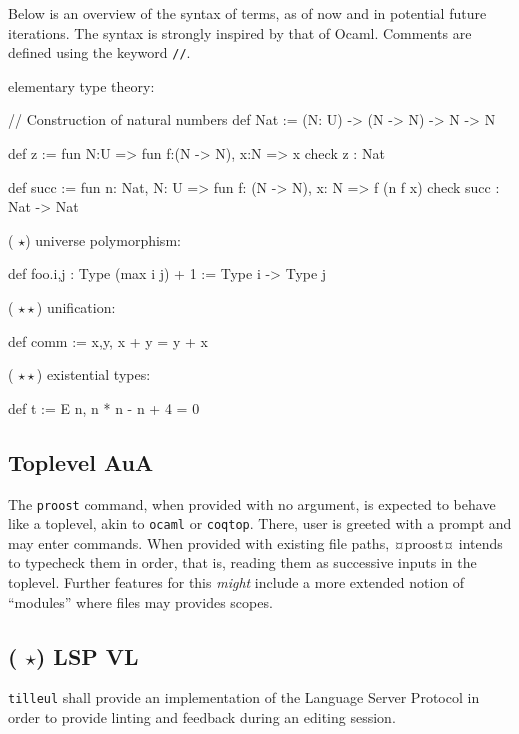\documentclass[twocolumn]{article}
\newcommand{\members}[1]{\texorpdfstring{\hfill\scriptsize #1}{}}
\newcommand{\etun}{({\color{Green} $\star$}) }
\newcommand{\etde}{({\color{Orange} $\star\star$}) }
\begin{document}
Below is an overview of the syntax of terms, as of now and in potential future iterations. The syntax is strongly inspired by that of Ocaml. Comments are defined using the keyword \texttt{//}.

\vspace{1.5mm}
elementary type theory:
\begin{proost}
// Construction of natural numbers
def Nat :=
(N: U) -> (N -> N) -> N -> N

def z :=
fun N:U => fun f:(N -> N), x:N => x
check z : Nat

def succ := fun n: Nat, N: U =>
fun f: (N -> N), x: N => f (n f x)
check succ : Nat -> Nat
\end{proost}

\etun universe polymorphism:
\begin{proost}
def foo.{i,j} : Type (max i j) + 1
:= Type i -> Type j
\end{proost}

\etde unification:
\begin{proost}
def comm := \/ x,y, x + y = y + x
\end{proost}

\etde existential types:
\begin{proost}
def t := E n, n * n - n + 4 = 0
\end{proost}


\subsection{Toplevel  \members{AuA}}
The \texttt{proost} command, when provided with no argument, is expected to behave like a toplevel, akin to \texttt{ocaml} or \texttt{coqtop}. There, user is greeted with a prompt and may enter commands. When provided with existing file paths, ¤proost¤ intends to typecheck them in
order, that is, reading them as successive inputs in the toplevel. Further features for this \emph{might} include a more extended notion of ``modules'' where files may provides scopes.
{
  \begin{center}
  \end{center}
}


\subsection{\etun LSP \members{VL}}
\texttt{tilleul} shall provide an implementation of the Language Server Protocol in order to provide linting and feedback during an editing session.
\end{document}
